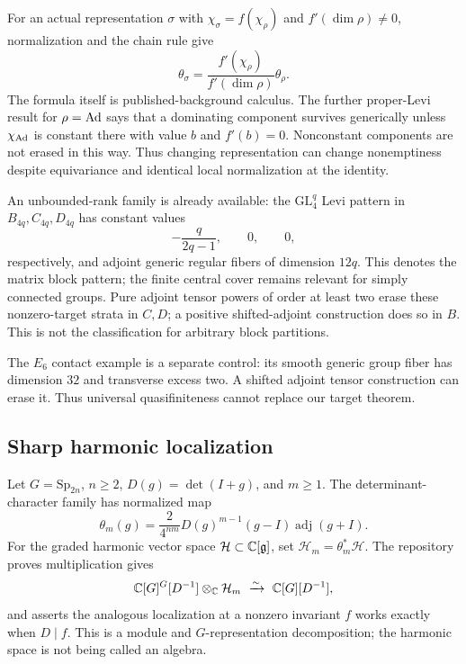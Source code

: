 For an actual representation $\sigma$ with $\chi_\sigma=f(\chi_\rho)$ and $f'(\dim\rho)\ne0$, normalization and the chain rule give
\begin{equation}\label{eq:composition}
\theta_\sigma=\frac{f'(\chi_\rho)}{f'(\dim\rho)}\theta_\rho.
\end{equation}
The formula itself is published-background calculus. The further proper-Levi result for $\rho=\operatorname{Ad}$ says that a dominating component survives generically unless $\chi_{\operatorname{Ad}}$ is constant there with value $b$ and $f'(b)=0$. Nonconstant components are not erased in this way. Thus changing representation can change nonemptiness despite equivariance and identical local normalization at the identity.

An unbounded-rank family is already available: the $\mathrm{GL}_4^q$ Levi pattern in $B_{4q},C_{4q},D_{4q}$ has constant values
\[
-\frac{q}{2q-1},\qquad 0,\qquad 0,
\]
respectively, and adjoint generic regular fibers of dimension $12q$. This denotes the matrix block pattern; the finite central cover remains relevant for simply connected groups. Pure adjoint tensor powers of order at least two erase these nonzero-target strata in $C,D$; a positive shifted-adjoint construction does so in $B$. This is not the classification for arbitrary block partitions.

The $E_6$ contact example is a separate control: its smooth generic group fiber has dimension $32$ and transverse excess two. A shifted adjoint tensor construction can erase it. Thus universal quasifiniteness cannot replace our target theorem.

\subsection{Sharp harmonic localization}

Let $G=\mathrm{Sp}_{2n}$, $n\ge2$, $D(g)=\det(I+g)$, and $m\ge1$. The determinant-character family has normalized map
\[
\theta_m(g)=\frac{2}{4^{nm}}D(g)^{m-1}(g-I)\operatorname{adj}(g+I).
\]
For the graded harmonic vector space $\mathcal H\subset\mathbb C[\mathfrak g]$, set $\mathcal H_m=\theta_m^*\mathcal H$. The repository proves multiplication gives
\begin{equation}\label{eq:harm}
\mathbb C[G]^G[D^{-1}]\otimes_\mathbb C\mathcal H_m
\ \xrightarrow{\sim}\ \mathbb C[G][D^{-1}],
\end{equation}
and asserts the analogous localization at a nonzero invariant $f$ works exactly when $D\mid f$. This is a module and $G$-representation decomposition; the harmonic space is not being called an algebra.

